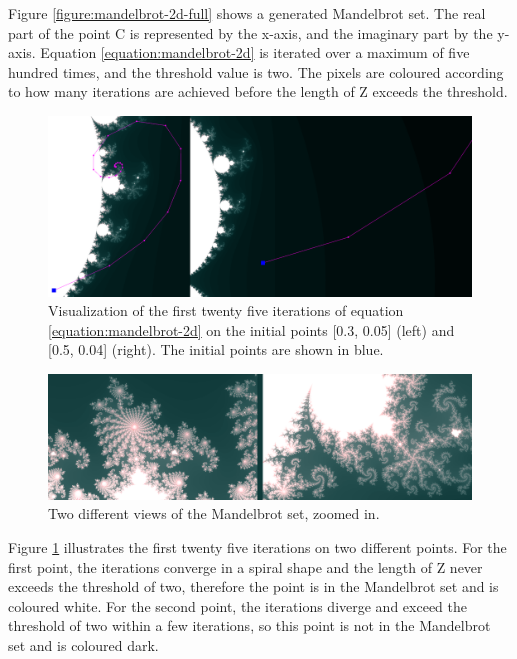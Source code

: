 Figure \ref{figure:mandelbrot-2d-full} shows a generated Mandelbrot set. The real part of the point C is represented by the x-axis, and the imaginary part by the y-axis. Equation \ref{equation:mandelbrot-2d} is iterated over a maximum of five hundred times, and the threshold value is two. The pixels are coloured according to how many iterations are achieved before the length of Z exceeds the threshold.

\newpage

\begin{figure} [ht]
	\centering
	\includegraphics[width=\linewidth, frame]{Images/Mandelbrot-2D-Iterations.png}
	\caption{Visualization of the first twenty five iterations of equation \ref{equation:mandelbrot-2d} on the initial points [0.3, 0.05] (left) and [0.5, 0.04] (right). The initial points are shown in blue.}
	\label{figure:mandelbrot-2d-iterations}
\end{figure}

\begin{figure} [ht]
	\centering
	\includegraphics[width=\linewidth, frame]{Images/Mandelbrot-2D-Zoom.png}
	\caption{Two different views of the Mandelbrot set, zoomed in.}
	\label{figure:mandelbrot-2d-zoom}
\end{figure}

Figure \ref{figure:mandelbrot-2d-iterations} illustrates the first twenty five iterations on two different points. For the first point, the iterations converge in a spiral shape and the length of Z never exceeds the threshold of two, therefore the point is in the Mandelbrot set and is coloured white. For the second point, the iterations diverge and exceed the threshold of two within a few iterations, so this point is not in the Mandelbrot set and is coloured dark.\newline

